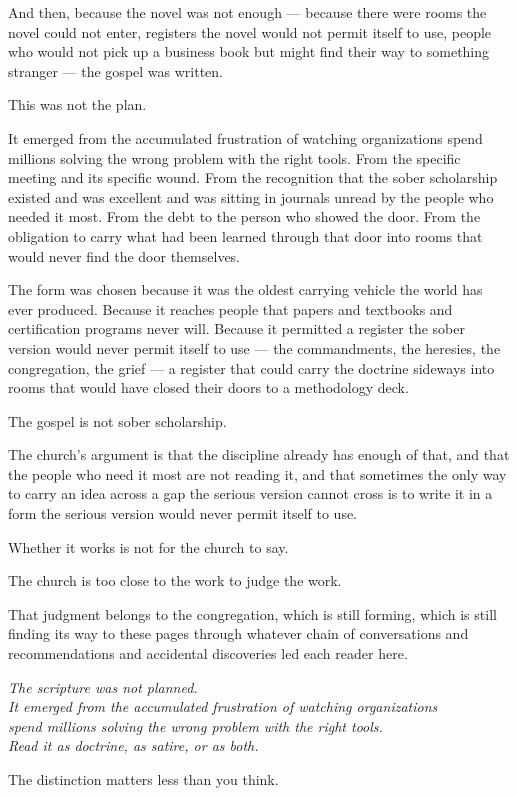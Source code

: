 And then, because the novel was not enough --- because there were rooms the novel could not enter, registers the novel would not permit itself to use, people who would not pick up a business book but might find their way to something stranger --- the gospel was written.

This was not the plan.

It emerged from the accumulated frustration of watching organizations spend millions solving the wrong problem with the right tools. From the specific meeting and its specific wound. From the recognition that the sober scholarship existed and was excellent and was sitting in journals unread by the people who needed it most. From the debt to the person who showed the door. From the obligation to carry what had been learned through that door into rooms that would never find the door themselves.

The form was chosen because it was the oldest carrying vehicle the world has ever produced. Because it reaches people that papers and textbooks and certification programs never will. Because it permitted a register the sober version would never permit itself to use --- the commandments, the heresies, the congregation, the grief --- a register that could carry the doctrine sideways into rooms that would have closed their doors to a methodology deck.

The gospel is not sober scholarship.

The church's argument is that the discipline already has enough of that, and that the people who need it most are not reading it, and that sometimes the only way to carry an idea across a gap the serious version cannot cross is to write it in a form the serious version would never permit itself to use.

Whether it works is not for the church to say.

The church is too close to the work to judge the work.

That judgment belongs to the congregation, which is still forming, which is still finding its way to these pages through whatever chain of conversations and recommendations and accidental discoveries led each reader here.

\vspace{2em}
\begin{center}
  \itshape The scripture was not planned.\\
  It emerged from the accumulated frustration of watching organizations\\
  spend millions solving the wrong problem with the right tools.\\[1em]
  Read it as doctrine, as satire, or as both.
\end{center}

\vspace{1em}
\begin{center}
  The distinction matters less than you think.
\end{center}
